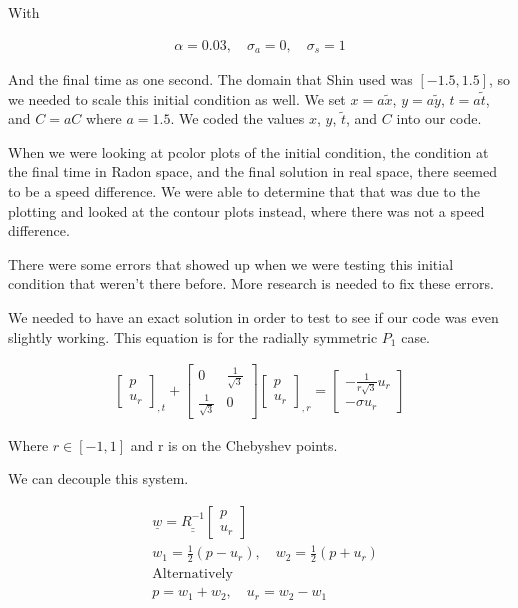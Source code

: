 \documentclass[12pt]{article}
\newcommand{\bunderline}[1]{\underline{#1}}
\renewcommand{\vec}[1]{{\bunderline{#1}}}
\newcommand{\mat}[1]{{\bunderline{\bunderline{#1}}}}
\begin{document}
With 

\begin{align*}
\alpha = 0.03, \quad
\sigma _a = 0, \quad
\sigma _s = 1
\end{align*}

And the final time as one second. The domain that Shin used was $[-1.5, 1.5]$, so we needed to scale this initial condition as well. We set $x = a\tilde{x}$, $y = a\tilde{y}$, $t = a\tilde{t}$, and $C = aC$ where $a = 1.5$. We coded the values $x$, $y$, $\tilde{t}$, and $C$ into our code.

When we were looking at pcolor plots of the initial condition, the condition at the final time in Radon space, and the final solution in real space, there seemed to be a speed difference. We were able to determine that that was due to the plotting and looked at the contour plots instead, where there was not a speed difference.

There were some errors that showed up when we were testing this initial condition that weren't there before. More research is needed to fix these errors.

We needed to have an exact solution in order to test to see if our code was even slightly working. This equation is for the radially symmetric $P_1$ case. 

\begin{align*}
\begin{bmatrix}
p \\
u_r
\end{bmatrix} _{,t}
+
\begin{bmatrix}
0 & \frac{1}{\sqrt{3}} \\
\frac{1}{\sqrt{3}} & 0
\end{bmatrix}
\begin{bmatrix}
p \\
u_r
\end{bmatrix} _{,r}
=
\begin{bmatrix}
-\frac{1}{r\sqrt{3}} u_r \\
-\sigma u_r
\end{bmatrix}
\end{align*}

Where $r \in [-1, 1]$ and r is on the Chebyshev points. 

We can decouple this system.

\begin{align*}
&\vec{w} = \mat{R^{-1}}
\begin{bmatrix}
p \\
u_r
\end{bmatrix} \\
&w_1 = \frac{1}{2}(p - u_r), \quad
w_2 = \frac{1}{2}(p + u_r) \\
&\text{Alternatively} \\
&p = w_1 + w_2, \quad
u_r = w_2 - w_1
\end{align*}
\end{document}
